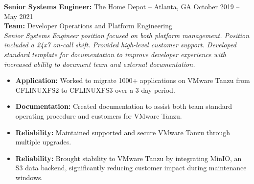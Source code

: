 \documentclass[11pt]{article}
\begin{document}
\begin{description}
\item\textbf{Senior Systems Engineer:} {The Home Depot} -- Atlanta, GA \hfill October 2019 -- May 2021 \\
\textbf{Team:} Developer Operations and Platform Engineering \\
\textit{Senior Systems Engineer position focused on both platform management. Position included a 24x7 on-call shift. Provided high-level customer support. Developed standard template for documentation to improve developer experience with increased ability to document team and external documentation.} \\
\vspace{-6.5pt}
\begin{itemize}
  \item \textbf{Application:} Worked to migrate 1000+ applications on VMware Tanzu from CFLINUXFS2 to CFLINUXFS3 over a 3-day period.
  \item \textbf{Documentation:} Created documentation to assist both team standard operating procedure and customers for VMware Tanzu.
  \item \textbf{Reliability:} Maintained supported and secure VMware Tanzu through multiple upgrades.
  \item \textbf{Reliability:} Brought stability to VMware Tanzu by integrating MinIO, an S3 data backend, significantly reducing customer impact during maintenance windows.
\end{itemize}
\end{description}
\end{document}
